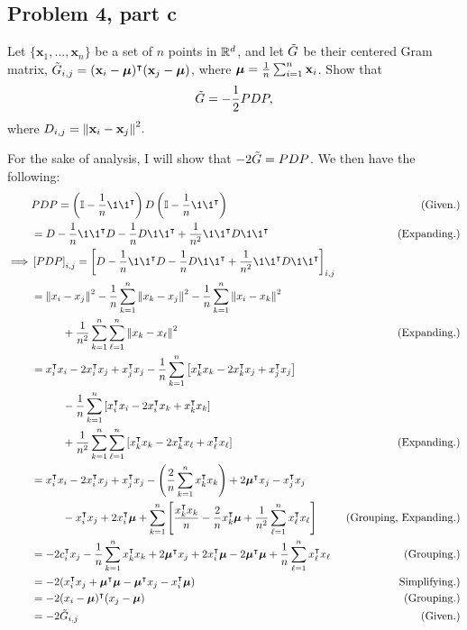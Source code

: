 \subsection{Problem 4, part c}
Let $\{ \textbf{x}_1, ..., \textbf{x}_n\}$ be a set of $n$ points in $\mathbb{R}^d$, and let $\Tilde{G}$ be their centered Gram matrix, $\Tilde{G}_{i, j} = (\textbf{x}_i - \boldsymbol{\mu})^{\intercal} (\textbf{x}_j - \boldsymbol{\mu})$, where $\boldsymbol{\mu} = \frac{1}{n}\sum_{i = 1}^n \textbf{x}_i$. Show that
\[\Tilde{G} = -\frac{1}{2}PDP,\]
where $D_{i, j} = \norm{\textbf{x}_i - \textbf{x}_j}^2.$
\partbreak
\begin{solution}

    For the sake of analysis, I will show that $-2\Tilde{G} = PDP$. We then have the following:
    \tightalignbreak
    \begin{align*}
        &PDP = \left(\id - \frac{1}{n}\1\1\T\right)D\left(\id - \frac{1}{n}\1\1\T\right) &\text{(Given.)}\\
        &= D - \frac{1}{n}\1\1\T D - \frac{1}{n}D\1\1\T + \frac{1}{n^2}\1\1\T D\1\1\T &\text{(Expanding.)} \\
        \implies &\left[PDP\right]_{i, j} = \left[D - \frac{1}{n}\1\1\T D - \frac{1}{n}D\1\1\T + \frac{1}{n^2}\1\1\T D\1\1\T\right]_{i, j}\\
        &= \norm{x_i - x_j}^2 - \frac{1}{n}\sum_{k = 1}^n\norm{x_k - x_j}^2 -\frac{1}{n}\sum_{k = 1}^n\norm{x_i - x_k}^2\\&\hspace{10mm} + \frac{1}{n^2}\sum_{k = 1}^n\sum_{\ell = 1}^n\norm{x_k - x_\ell}^2 &\text{(Expanding.)}\\
        &= x_i\T x_i - 2x_i\T x_j + x_j\T x_j - \frac{1}{n}\sum_{k=1}^n\left[x_k\T x_k - 2x_k\T x_j + x_j\T x_j\right] \\&\hspace{10mm}- \frac{1}{n}\sum_{k = 1}^n\left[x_i\T x_i - 2x_i\T x_k + x_k\T x_k\right] \\&\hspace{10mm}+ \frac{1}{n^2}\sum_{k = 1}^n\sum_{\ell = 1}^n\left[x_k\T x_k - 2x_k\T x_\ell + x_{\ell}\T x_{\ell}\right] &\text{(Expanding.)}\\
        &= x_i\T x_i - 2x_i\T x_j + x_j\T x_j - \left(\frac{2}{n}\sum_{k = 1}^nx_k\T x_k\right) + 2\bmu\T x_j - x_j\T x_j \\&\hspace{10mm}- x_i\T x_j + 2x_i\T \bmu + \sum_{k = 1}^n\left[\frac{x_k\T x_k}{n} - \frac{2}{n}x_k\T \bmu + \frac{1}{n^2}\sum_{\ell = 1}^n x_\ell \T x_\ell\right] &\text{(Grouping, Expanding.)}\\
        &= -2c_i\T x_j - \frac{1}{n}\sum_{k  =1}^n x_k\T x_k + 2\bmu\T x_j + 2x_i\T \bmu - 2\bmu\T \bmu + \frac{1}{n}\sum_{\ell = 1}^nx_\ell\T x_\ell&\text{(Grouping.)}\\
        &= -2(x_i \T x_j + \bmu\T \bmu - \bmu\T x_j - x_i\T \bmu) &\text{Simplifying.)}\\
        &= -2(x_i - \bmu)\T(x_j - \bmu) &\text{(Grouping.)}\\
        &= -2\Tilde{G}_{i, j}&\text{(Given.)}
    \end{align*}\vspace{-12mm}\alignbreak
\end{solution}

